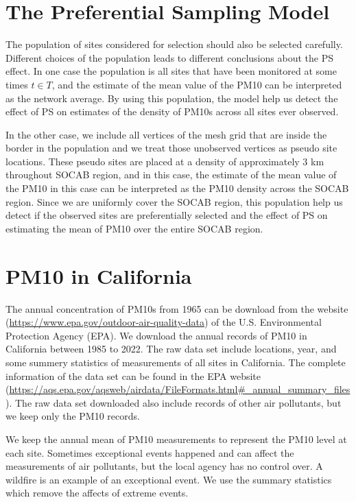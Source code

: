 \section{The Preferential Sampling Model}
The population of sites considered for selection should also be selected carefully.
Different choices of the population leads to different conclusions about the PS effect. 
In one case the population is all sites that have been monitored at some times $t \in T$, and
the estimate of the mean value of the PM10 can be interpreted as the network average.
By using this population, the model help us detect the effect of PS on estimates of the density of 
PM10s across all sites ever observed. 

In the other case, we include all vertices of the mesh grid that are inside the border in the 
population and we treat those unobserved vertices as pseudo site locations. These pseudo sites are
placed at a density of approximately 3 km throughout SOCAB region, and in this case, the estimate 
of the mean value of the PM10 in this case can be interpreted as the PM10 density across the SOCAB
region. Since we are uniformly cover the 
SOCAB region, this population help us detect if the observed sites are preferentially selected and 
the effect of PS on estimating the mean of PM10 over the entire SOCAB region.

\section{PM10 in California}
The annual concentration of PM10s from 1965 can be download from the website (\url{https://www.epa.gov/outdoor-air-quality-data}) 
of the U.S. Environmental Protection Agency (EPA). We download the annual records of PM10 in California 
between 1985 to 2022. The raw data set include locations, year, and some summery statistics of 
measurements of all sites in California. The complete information of the data set can be found in
the EPA website (\url{https://aqs.epa.gov/aqsweb/airdata/FileFormats.html#_annual_summary_files}).
The raw data set downloaded also include records of other air pollutants, but we keep only the PM10
records.

We keep the annual mean of PM10 measurements to represent the PM10 level at each site.
Sometimes exceptional events happened and can affect the measurements of air pollutants, 
but the local agency has no control over. A wildfire is an example of an exceptional event. 
We use the summary statistics which remove the affects of extreme events.  


